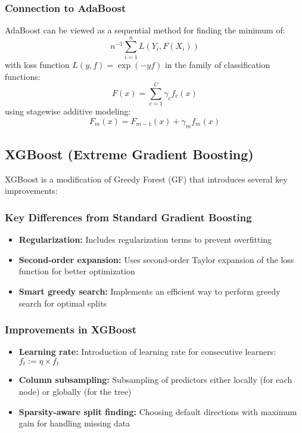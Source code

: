 \documentclass[12pt,a4paper]{article}
\begin{document}
\subsubsection{Connection to AdaBoost}
AdaBoost can be viewed as a sequential method for finding the minimum of:
\begin{equation}
n^{-1}\sum_{i=1}^n L(Y_i, F(X_i))
\end{equation}
with loss function $L(y,f) = \exp(-yf)$ in the family of classification functions:
\begin{equation}
F(x) = \sum_{c=1}^C \gamma_c f_c(x)
\end{equation}
using stagewise additive modeling: 
\begin{equation}
F_m(x) = F_{m-1}(x) + \gamma_m f_m(x)
\end{equation}

\subsection{XGBoost (Extreme Gradient Boosting)}

XGBoost is a modification of Greedy Forest (GF) that introduces several key improvements:

\subsubsection{Key Differences from Standard Gradient Boosting}
\begin{itemize}
    \item \textbf{Regularization:} Includes regularization terms to prevent overfitting
    \item \textbf{Second-order expansion:} Uses second-order Taylor expansion of the loss function for better optimization
    \item \textbf{Smart greedy search:} Implements an efficient way to perform greedy search for optimal splits
\end{itemize}

\subsubsection{Improvements in XGBoost}
\begin{itemize}
    \item \textbf{Learning rate:} Introduction of learning rate for consecutive learners: $f_t := \eta \times f_t$
    \item \textbf{Column subsampling:} Subsampling of predictors either locally (for each node) or globally (for the tree)
    \item \textbf{Sparsity-aware split finding:} Choosing default directions with maximum gain for handling missing data
\end{itemize}
\end{document}
